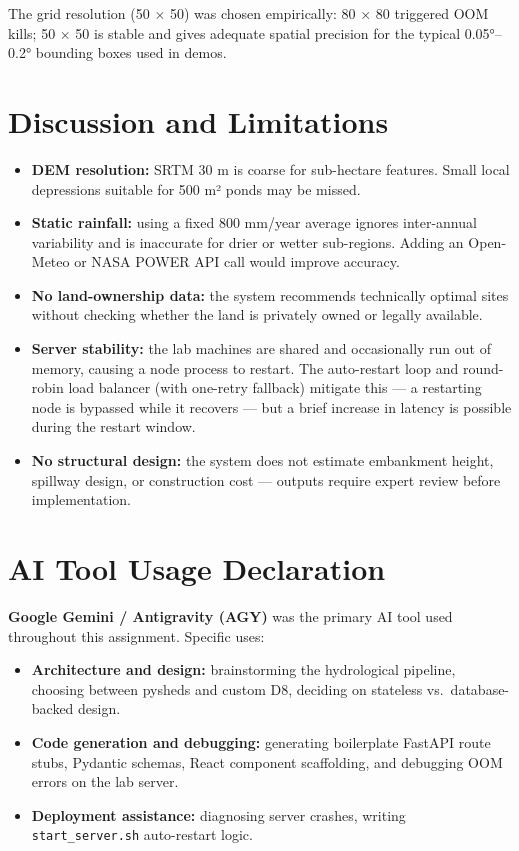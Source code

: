 \documentclass[manuscript,screen,review]{acmart}
\begin{document}
The grid resolution (50 × 50) was chosen empirically: 80 × 80
triggered OOM kills; 50 × 50 is stable and gives adequate spatial
precision for the typical 0.05°--0.2° bounding boxes used in demos.

\section{Discussion and Limitations}
\label{sec:discussion}

\begin{itemize}
  \item \textbf{DEM resolution:} SRTM 30 m is coarse for sub-hectare
        features. Small local depressions suitable for 500 m² ponds
        may be missed.
  \item \textbf{Static rainfall:} using a fixed 800 mm/year average
        ignores inter-annual variability and is inaccurate for drier
        or wetter sub-regions. Adding an Open-Meteo or NASA POWER API
        call would improve accuracy.
  \item \textbf{No land-ownership data:} the system recommends
        technically optimal sites without checking whether the land
        is privately owned or legally available.
  \item \textbf{Server stability:} the lab machines are shared and
        occasionally run out of memory, causing a node process to
        restart. The auto-restart loop and round-robin load balancer
        (with one-retry fallback) mitigate this --- a restarting node
        is bypassed while it recovers --- but a brief increase in
        latency is possible during the restart window.
  \item \textbf{No structural design:} the system does not estimate
        embankment height, spillway design, or construction cost ---
        outputs require expert review before implementation.
\end{itemize}

\section{AI Tool Usage Declaration}
\label{sec:ai-usage}

\textbf{Google Gemini / Antigravity (AGY)} was the primary AI tool
used throughout this assignment. Specific uses:

\begin{itemize}
  \item \textbf{Architecture and design:} brainstorming the
        hydrological pipeline, choosing between pysheds and custom
        D8, deciding on stateless vs.\ database-backed design.
  \item \textbf{Code generation and debugging:} generating boilerplate
        FastAPI route stubs, Pydantic schemas, React component
        scaffolding, and debugging OOM errors on the lab server.
  \item \textbf{Deployment assistance:} diagnosing server crashes,
        writing \texttt{start\_server.sh} auto-restart logic.
\end{itemize}
\end{document}
